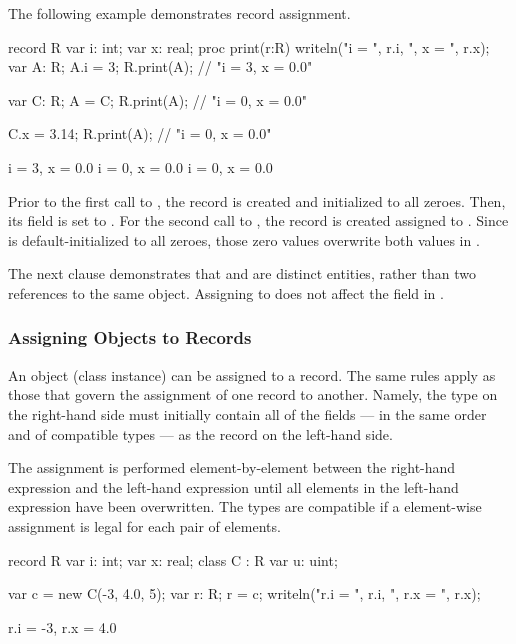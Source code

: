 The following example demonstrates record assignment.
\begin{example}
\begin{chapelpre}
\end{chapelpre}
\begin{chapel}
record R {
  var i: int;
  var x: real;
  proc print(r:R) { writeln("i = ", r.i, ", x = ", r.x); }
}
var A: R;
A.i = 3;
R.print(A);	// "i = 3, x = 0.0"

var C: R;
A = C;
R.print(A);	// "i = 0, x = 0.0"

C.x = 3.14;
R.print(A);	// "i = 0, x = 0.0"
\end{chapel}
\begin{chapeloutput}
i = 3, x = 0.0
i = 0, x = 0.0
i = 0, x = 0.0
\end{chapeloutput}
\end{example}
Prior to the first call to , the record  is created and
initialized to all zeroes.  Then, its  field is set to .
For the second call to , the record  is created assigned
to .  Since  is default-initialized to all zeroes, those zero
values overwrite both values in .

The next clause demonstrates that  and  are distinct entities,
rather than two references to the same object.  Assigning 
to  does not affect the  field in .

\subsubsection{Assigning Objects to Records}
\label{Assigning_Objects_to_Records}

An object (class instance) can be assigned to a record.  The same rules apply as
those that govern the assignment of one record to another.  Namely, the type on
the right-hand side must initially contain all of the fields --- in the same
order and of compatible types --- as the record on the left-hand side.

The assignment is performed element-by-element between the right-hand expression
and the left-hand expression until all elements in the left-hand expression have
been overwritten.  The types are compatible if a element-wise assignment is
legal for each pair of elements.

\begin{example}
\begin{chapelpre}
\end{chapelpre}
\begin{chapel}
record R {
  var i: int;
  var x: real;
}
class C : R {
  var u: uint;
}

var c = new C(-3, 4.0, 5);
var r: R;
r = c;
writeln("r.i = ", r.i, ", r.x = ", r.x);
\end{chapel}
\begin{chapeloutput}
r.i = -3, r.x = 4.0
\end{chapeloutput}
\end{example}

